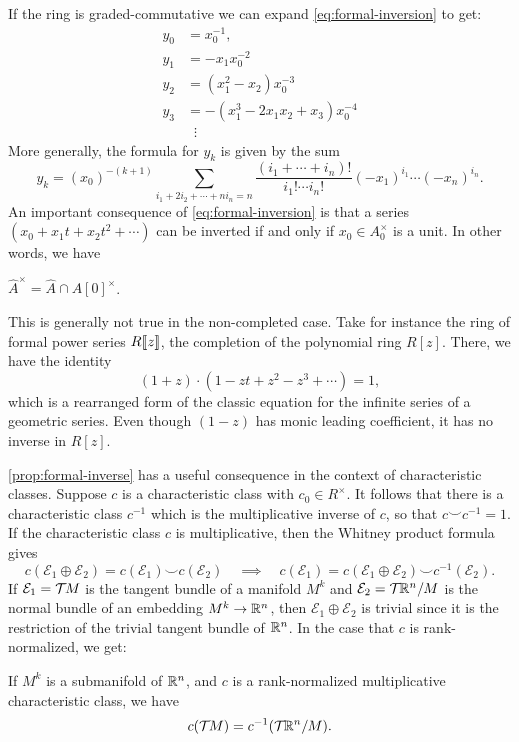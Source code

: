 If the ring is graded-commutative we can expand \cref{eq:formal-inversion} to get: 
\[
	\begin{aligned}
		y_0 & = x_0^{-1},                        \\
		y_1 & = -x_1x_0^{-2}                     \\
		y_2 & = (x_1^2-x_2)x_0^{-3}              \\
		y_3 & = -(x_1^3 - 2x_1x_2 + x_3)x_0^{-4} \\
		    & \;\;\vdots
	\end{aligned}
\]
More generally, the formula for $y_k$ is given by the sum
\begin{equation}\label{eq:general-formal-inversion}
	y_k = (x_0)^{-(k+1)}\sum_{i_1+2i_2+\cdots+ni_n=n} \frac{(i_1+\cdots+i_n)!}{i_1!\cdots i_n!}(-x_1)^{i_1}\cdots (-x_n)^{i_n}.
\end{equation}
An important consequence of \cref{eq:formal-inversion} is that a series $(x_0+x_1t+x_2t^2+\cdots)$ can be inverted if and only if $x_0\in A_0^\times$ is a unit. In other words, we have

\begin{proposition}\label{prop:formal-inverse}
	$\widehat{A}^\times = \widehat{A} \cap A[0]^\times$.
\end{proposition}

\begin{remark*}
	This is generally not true in the non-completed case. Take for instance the ring of formal power series $R[\![z]\!]$, the completion of the polynomial ring $R[z]$. There, we have the identity
	\[
		(1+z)\cdot (1-zt+z^2-z^3+\cdots) = 1,
	\]
	which is a rearranged form of the classic equation for the infinite series of a geometric series. Even though $(1-z)$ has monic leading coefficient, it has no inverse in $R[z]$.
\end{remark*}

\cref{prop:formal-inverse} has a useful consequence in the context of characteristic classes. Suppose $c$ is a characteristic class with $c_0\in R^\times$. It follows that there is a characteristic class $c^{-1}$ which is the multiplicative inverse of $c$, so that $c\smile c^{-1}=1$. If the characteristic class $c$ is multiplicative, then the Whitney product formula gives
\[
	c(\mathcal{E}_1\oplus\mathcal{E}_2)	 = c(\mathcal{E}_1)\smile c(\mathcal{E}_2)
	\quad\implies\quad
	c(\mathcal{E}_1) = c(\mathcal{E}_1\oplus \mathcal{E}_2) \smile c^{-1}(\mathcal{E}_2).
\]
If $\mathcal{E}_1={\mathcal{T}\hspace{-0.1em}} M$ is the tangent bundle of a manifold $M^k$ and $\mathcal{E}_2={\mathcal{T}\hspace{-0.1em}}\mathbb{R}^{n}/M$ is the normal bundle of an embedding $M^k\to \mathbb{R}^{n}$, then $\mathcal{E}_1\oplus \mathcal{E}_2$ is trivial since it is the restriction of the trivial tangent bundle of $\mathbb{R}^n$. In the case that $c$ is rank-normalized, we get:
\begin{theorem}\label{thm:whitney-duality}
	If $M^k$ is a submanifold of $\mathbb{R}^n$, and $c$ is a rank-normalized multiplicative characteristic class, we have
	\[
		c({\mathcal{T}\hspace{-0.1em}} M) = c^{-1}({\mathcal{T}\hspace{-0.1em}} \mathbb{R}^n/M).
	\]
\end{theorem}

